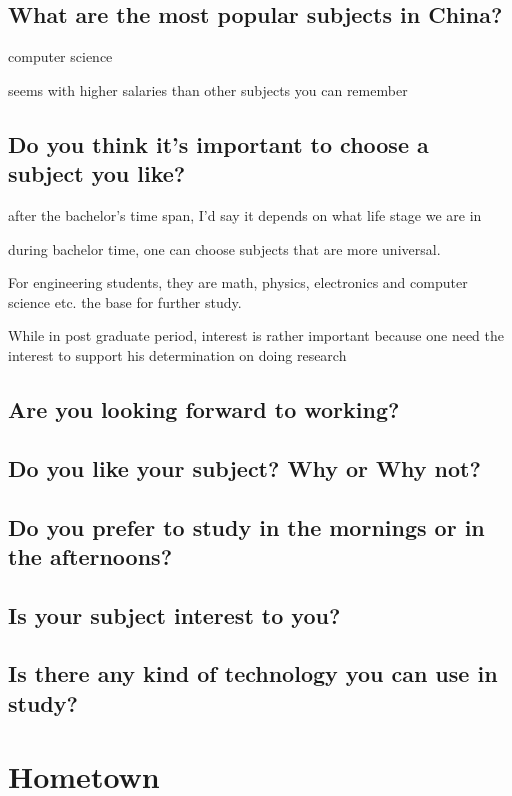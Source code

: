 \documentclass[conference]{IEEEtran}
\begin{document}
\subsection{What are the most popular subjects in China?}
computer science

seems with higher salaries than other subjects you can remember

\subsection{Do you think it's important to choose a subject you like?}
after the bachelor's time span, I'd say it depends on what life stage we are in

during bachelor time, one can choose subjects that are more universal.

For engineering students, they are math, physics, electronics and computer science etc.
the base for further study.

While in post graduate period, interest is rather important because
one need the interest to support his determination on doing research




\subsection{Are you looking forward to working?}

\subsection{Do you like your subject? Why or Why not?}

\subsection{Do you prefer to study in the mornings or in the afternoons?}

\subsection{Is your subject interest to you?}

\subsection{Is there any kind of technology you can use in study?}


\section{Hometown}
\end{document}

